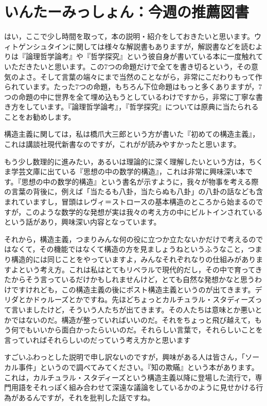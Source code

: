 \documentclass{ltjsbook}
\begin{document}
\section*{いんたーみっしょん：今週の推薦図書}

はい，ここで少し時間を取って，本の説明・紹介をしておきたいと思います。ウィトゲンシュタインに関しては様々な解説書もありますが，解説書などを読むよりは『論理哲学論考』や『哲学探究』という彼自身が書いている本に一度触れていただきたいと思います。この7つの命題だけで全てを書き切るという，その意気のよさ。そして言葉の端々にまで当然のことながら，非常にこだわりもって作られています。たった7つの命題，もちろん下位命題はもっと多くありますが，7つの命題の中に世界を全て埋め込もうとしているわけですから，非常に丁寧な書き方をしています。『論理哲学論考』，『哲学探究』については原典に当たられることをお勧めします。

構造主義に関しては，私は橋爪大三郎という方が書いた『初めての構造主義』\parencite{Hasidume1988}，これは講談社現代新書なのですが，これがが読みやすかったと思います。

もう少し数理的に進みたい，あるいは理論的に深く理解したいという方は，ちくま学芸文庫に出ている『思想の中の数学的構造』\parencite{MasoYamashita2006}，これは非常に興味深い本です。『思想の中の数学的構造』という書名が示すように，我々が物事を考える際の言葉の背後に，例えば「当たるも八卦，当たらぬも八卦」の八卦の話なども含まれていますし，冒頭はレヴィ＝ストロースの基本構造のところから始まるのですが，このような数学的な発想が実は我々の考え方の中にビルトインされているという話があり，興味深い内容となっています。

それから，構造主義，つまりみんな何の役に立つか立たないかだけで考えるのではなくて，その機能ではなくて構造の方を見ましょうねというふうなこと，つまり構造的には同じことをやっていますよ，みんなそれぞれなりの仕組みがありますよという考え方。これは私はとてもリベラルで現代的だし，その中で育ってきたからそう言っているだけかもしれませんけど，とても自然な発想かなと思うわけですけれども，この構造主義の後にポスト構造主義というのが出てきます。デリダとかドゥルーズとかですね。先ほどちょっとカルチュラル・スタディーズって言いましたけど，そういう人たちが出てきます。その人たちは意味とか悪いとかではないのだ。構造が整っていればいいのだ。それをちょっと飛び越えて，もう何でもいいから面白かったらいいのだ。それらしい言葉で，それらしいことを言っていればそれらしいのだっていう考え方かと思います

すごいふわっとした説明で申し訳ないのですが，興味がある人は皆さん，「ソーカル事件」というので調べてみてください。『知の欺瞞』という本があります\parencite{chinogiman}。これは，カルチュラル・スタディーズという構造主義以降に登場した流行で，専門用語をそれっぽく組み合わせて深遠な議論をしているかのように見せかける行為があるんですが，それを批判した話ですね。
\end{document}
